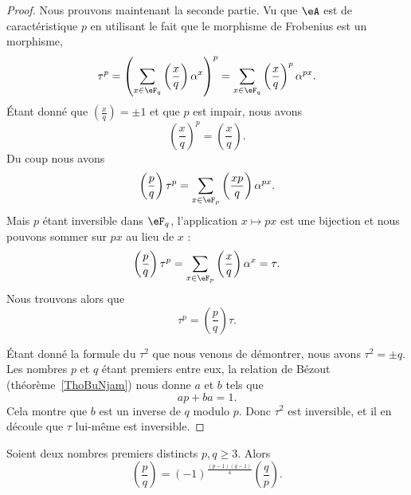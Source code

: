 \begin{proof}
    Nous prouvons maintenant la seconde partie. Vu que \( \eA\) est de caractéristique \( p\) en utilisant le fait que le morphisme de Frobenius est un morphisme,
    \begin{equation}
        \tau^p=\left( \sum_{x\in \eF_q}\left(\frac{x}{q}\right)\alpha^x \right)^p=\sum_{x\in \eF_q}\left(\frac{x}{q}\right)^p\alpha^{px}.
    \end{equation}
    Étant donné que \( \left(\frac{x}{q}\right)=\pm 1\) et que \( p\) est impair, nous avons
    \begin{equation}
        \left(\frac{x}{q}\right)^p=\left(\frac{x}{q}\right).
    \end{equation}
    Du coup nous avons
    \begin{equation}
        \left(\frac{p}{q}\right)\tau^p=\sum_{x\in \eF_p}\left(\frac{xp}{q}\right)\alpha^{px}.
    \end{equation}
    Mais \( p\) étant inversible dans \( \eF_q\), l'application \( x\mapsto px\) est une bijection et nous pouvons sommer sur \( px\) au lieu de \( x\) :
    \begin{equation}
        \left(\frac{p}{q}\right)\tau^p=\sum_{x\in \eF_p}\left(\frac{x}{q}\right)\alpha^x=\tau.
    \end{equation}
    Nous trouvons alors que
    \begin{equation}
        \tau^p=\left(\frac{p}{q}\right)\tau.
    \end{equation}

    Étant donné la formule du \( \tau^2\) que nous venons de démontrer, nous avons \( \tau^2=\pm q\). Les nombres \( p\) et \( q\) étant premiers entre eux, la relation de Bézout (théorème~\ref{ThoBuNjam}) nous donne \( a\) et \( b\) tels que
    \begin{equation}
        ap+ba=1.
    \end{equation}
    Cela montre que \( b\) est un inverse de \( q\) modulo \( p\). Donc \( \tau^2\) est inversible, et il en découle que \( \tau\) lui-même est inversible.
\end{proof}

\begin{theorem}  \label{ThoMiEiUm}
    Soient deux nombres premiers distincts \( p,q\geq 3\). Alors
    \begin{equation}
        \left(\frac{p}{q}\right)=(-1)^{\frac{ (p-1)(q-1) }{ 4 }}\left(\frac{q}{p}\right).
    \end{equation}
\end{theorem}

